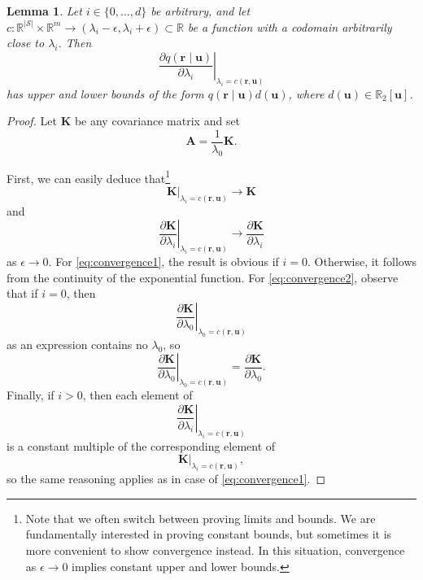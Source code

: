 \documentclass{mpaper}
\newtheorem{lemma}[theorem]{Lemma}
\begin{document}
\begin{lemma} \label{lemma:bound1}
  Let $i \in \{ 0, \dots, d \}$ be arbitrary, and let $c :
  \mathbb{R}^{|\mathcal{S}|} \times \mathbb{R}^m \to (\lambda_i - \epsilon,
  \lambda_i + \epsilon) \subset \mathbb{R}$ be a function with a codomain
  arbitrarily close to $\lambda_i$. Then
  \[
    \left. \frac{\partial q(\mathbf{r} \mid \mathbf{u})}{\partial \lambda_i}
    \right|_{\lambda_i = c(\mathbf{r}, \mathbf{u})}
  \]
  has upper and lower bounds of the form $q(\mathbf{r} \mid
  \mathbf{u})d(\mathbf{u})$, where $d(\mathbf{u}) \in \mathbb{R}_2[\mathbf{u}]$.
\end{lemma}
\begin{proof}
  Let $\mathbf{K}$ be any covariance matrix and set
  \[
    \mathbf{A} = \frac{1}{\lambda_0} \mathbf{K}.
  \]

  First, we can easily deduce that\footnote{Note that we often switch between
    proving limits and bounds. We are fundamentally interested in proving
    constant bounds, but sometimes it is more convenient to show convergence
    instead. In this situation, convergence as $\epsilon \to 0$ implies constant
    upper and lower bounds.}
  \begin{equation} \label{eq:convergence1}
    \mathbf{K}|_{\lambda_i = c(\mathbf{r}, \mathbf{u})} \to \mathbf{K}
  \end{equation}
  and
  \begin{equation} \label{eq:convergence2}
    \left. \frac{\partial \mathbf{K}}{\partial \lambda_i} \right|_{\lambda_i = c(\mathbf{r}, \mathbf{u})} \to \frac{\partial \mathbf{K}}{\partial \lambda_i}
  \end{equation}
  as $\epsilon \to 0$. For \eqref{eq:convergence1}, the result is obvious if $i
  = 0$. Otherwise, it follows from the continuity of the exponential function.
  For \eqref{eq:convergence2}, observe that if $i=0$, then
  \[
    \left. \frac{\partial \mathbf{K}}{\partial \lambda_0} \right|_{\lambda_0 =
      c(\mathbf{r}, \mathbf{u})}
  \]
  as an expression contains no $\lambda_0$, so
  \[
    \left. \frac{\partial \mathbf{K}}{\partial \lambda_0} \right|_{\lambda_0 =
      c(\mathbf{r}, \mathbf{u})} = \frac{\partial \mathbf{K}}{\partial
      \lambda_0}.
  \]
  Finally, if $i>0$, then each element of 
  \[
    \left. \frac{\partial \mathbf{K}}{\partial \lambda_i}
    \right|_{\lambda_i = c(\mathbf{r}, \mathbf{u})}
  \]
  is a constant multiple of the corresponding element of
  \[
    \mathbf{K}|_{\lambda_i = c(\mathbf{r}, \mathbf{u})},
  \]
  so the same reasoning applies as in case of \eqref{eq:convergence1}.


\end{proof}
\end{document}
